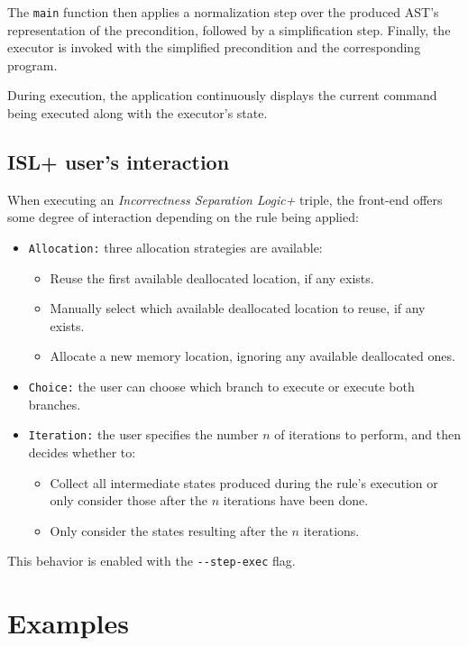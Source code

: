 \documentclass[parskip=half]{scrartcl}
\begin{document}
The \texttt{main} function then applies a normalization step over the produced AST's representation of the precondition, followed by a simplification step.
Finally, the executor is invoked with the simplified precondition and the corresponding program.

During execution, the application continuously displays the current command being executed along with the executor’s state.

\subsection{ISL+ user's interaction}
When executing an \textit{Incorrectness Separation Logic+} triple, the front-end offers some degree of interaction depending on the rule being applied:

\begin{itemize}
  \item \texttt{Allocation:} three allocation strategies are available:
    \begin{itemize}
      \item Reuse the first available deallocated location, if any exists.
      \item Manually select which available deallocated location to reuse, if any exists.
      \item Allocate a new memory location, ignoring any available deallocated ones.
    \end{itemize}
  \item \texttt{Choice:} the user can choose which branch to execute or execute both branches.
  \item \texttt{Iteration:} the user specifies the number $n$ of iterations to perform, and then decides whether to: 
    \begin{itemize}
      \item Collect all intermediate states produced during the rule's execution or only consider those after the $n$ iterations have been done.
      \item Only consider the states resulting after the $n$ iterations.
    \end{itemize}
\end{itemize}

This behavior is enabled with the \verb|--step-exec| flag.

\section{Examples}
\end{document}
